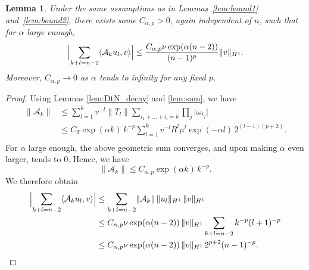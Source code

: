 \documentclass[a4paper,reqno,twoside]{amsart}
\numberwithin{equation}{section}
\newtheorem{lemma}[theorem]{Lemma}
\theoremstyle{definition}
\newcommand{\<}{\ensuremath \leq}
\renewcommand{\>}{\ensuremath \geq}
\begin{document}
\begin{lemma}\label{lem:bound3}
    Under the same assumptions as in Lemmas~\ref{lem:bound1} and~\ref{lem:bound2},
    there exists some $C_{\alpha,p} > 0$, again independent of $n$, such that for $\alpha$ large enough,
    \begin{equation}
        \Bigl\lvert \sum_{k+l = n-2} \langle \mathcal{A}_k u_l, v \rangle \Bigr\rvert
        \leq \frac{C_{\alpha,p} \nu \exp(\alpha(n-2))}{(n-1)^p} \lVert v \rVert_{H^1}.
    \end{equation}
    Moreover, $C_{\alpha,p}\rightarrow 0$ as $\alpha$ tends to infinity for any fixed $p$.
\end{lemma}

\begin{proof}
    Using Lemmas \ref{lem:DtN_decay} and \ref{lem:sum}, we have
    \begin{equation}
        \begin{aligned}
            \lVert \mathcal{A}_k \rVert
            &\leq \sum_{l=1}^{k} v^{-l}\lVert T_l \rVert
              \sum_{i_1 + \dots + i_l = k} \prod_j \lvert \omega_{i_j} \rvert \\
            &\leq C_T \exp(\alpha k) \, k^{-p}
              \sum_{l=1}^{k} v^{-l}R^l \mu^l \exp(-\alpha l) \, 2^{(l-1)(p+2)} .\\
        \end{aligned}
    \end{equation}
    For $\alpha$ large enough, the above geometric sum converges, and upon making $\alpha$ even larger, tends to 0. Hence, we have
    \begin{equation}
            \lVert \mathcal{A}_k \rVert \leq C_{\alpha,p} \exp(\alpha k) \, k^{-p}.
    \end{equation}
    We therefore obtain
    \begin{equation}
        \begin{aligned}
            \Bigl\lvert \sum_{k+l = n-2} \langle \mathcal{A}_k u_l, v \rangle \Bigr\rvert
            &\leq \sum_{k+l = n-2}
              \lVert \mathcal{A}_k \rVert \, \lVert u_l \rVert_{H^1} \, \lVert v \rVert_{H^1} \\
            &\leq C_{\alpha,p} \nu \exp(\alpha(n-2)) \, \lVert v \rVert_{H^1}
              \sum_{k+l = n-2} k^{-p} (l+1)^{-p} \\
            &\leq C_{\alpha,p} \nu \exp(\alpha(n-2)) \, \lVert v \rVert_{H^1} \,
              2^{p+2} (n-1)^{-p}.
        \end{aligned}
    \end{equation}
\end{proof}
\end{document}
